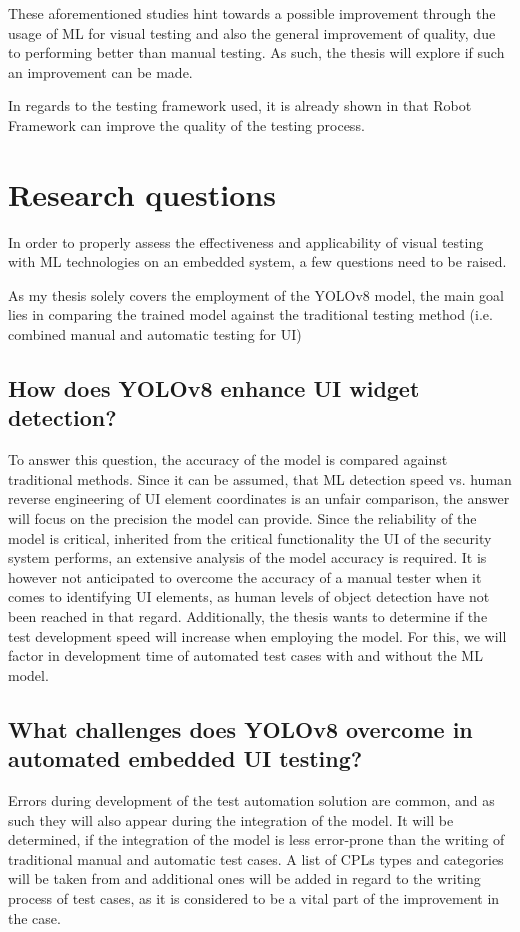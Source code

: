 \documentclass[Proposal,BIC,english,IEEE]{BASE/twbook} %
\begin{document}
These aforementioned studies hint towards a possible improvement through the usage of ML for visual testing and also the general improvement of quality, due to performing better than manual testing. As such, the thesis will explore if such an improvement can be made.

In regards to the testing framework used, it is already shown\autocite{walkerSoftwareTestAutomation2020a} in that Robot Framework can improve the quality of the testing process.

\newpage
\chapter{Research questions}
In order to properly assess the effectiveness and applicability of visual testing with ML technologies on an embedded system, a few questions need to be raised.

As my thesis solely covers the employment of the YOLOv8 model, the main goal lies in comparing the trained model against the traditional testing method (i.e. combined manual and automatic testing for UI)
\section{How does YOLOv8 enhance UI widget detection?}
To answer this question, the accuracy of the model is compared against traditional methods. Since it can be assumed, that ML detection speed vs. human reverse engineering of UI element coordinates is an unfair comparison, the answer will focus on the precision the model can provide.
Since the reliability of the model is critical, inherited from the critical functionality the UI of the security system performs, an extensive analysis of the model accuracy is required.
It is however not anticipated to overcome the accuracy of a manual tester when it comes to identifying UI elements, as human levels of object detection have not been reached in that regard.
Additionally, the thesis wants to determine if the test development speed will increase when employing the model. For this, we will factor in development time of automated test cases with and without the ML model.

\section{What challenges does YOLOv8 overcome in automated embedded UI testing?}
Errors during development of the test automation solution are common, and as such they will also appear during the integration of the model.
It will be determined, if the integration of the model is less error-prone than the writing of traditional manual and automatic test cases.
A list of CPLs types and categories will be taken from \autocite{alegrothVisualGUITesting2015} and additional ones will be added in regard to the writing process of test cases, as it is considered to be a vital part of the improvement in the case.
\end{document}
